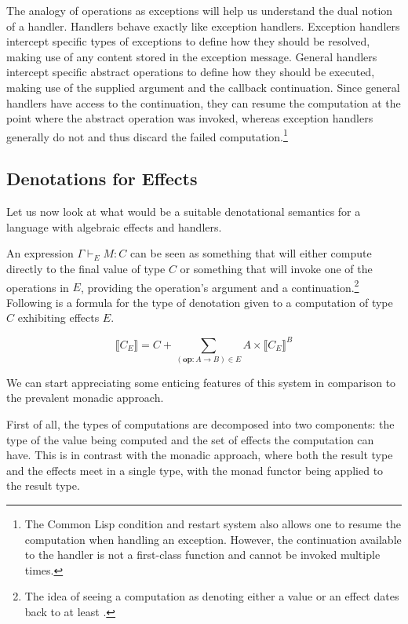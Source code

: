 \documentclass{article}
\newcommand{\sem}[1]{\llbracket #1 \rrbracket}
\newcommand{\effect}[1]{\textbf{#1}}
\begin{document}
The analogy of operations as exceptions will help us understand the dual
notion of a handler. Handlers behave exactly like exception
handlers. Exception handlers intercept specific types of exceptions to define
how they should be resolved, making use of any content stored in the exception
message. General handlers intercept specific abstract operations to define how
they should be executed, making use of the supplied argument and the callback
continuation. Since general handlers have access to the continuation, they can
resume the computation at the point where the abstract operation was invoked,
whereas exception handlers generally do not and thus discard the failed
computation.\footnote{The Common Lisp condition and restart system also allows
  one to resume the computation when handling an exception. However, the
  continuation available to the handler is not a first-class function and
  cannot be invoked multiple times.}

\subsection{Denotations for Effects}
\label{ssec:denotations-for-effects}

Let us now look at what would be a suitable denotational semantics for a
language with algebraic effects and handlers.

An expression $\Gamma \vdash_E M : C$ can be seen as something that will
either compute directly to the final value of type $C$ or something that will
invoke one of the operations in $E$, providing the operation's argument and a
continuation.\footnote{The idea of seeing a computation as denoting either a
  value or an effect dates back to at least \citet{cartwright1994extensible}.}
Following is a formula for the type of denotation given to a computation of type
$C$ exhibiting effects $E$. \citep{bauer2012programming}
\citep{kiselyov2013extensible}

$$
\sem{C_E} = C + \sum_{(\effect{op} : A \to B) \in E} A \times \sem{C_E}^B
$$

We can start appreciating some enticing features of this system in comparison
to the prevalent monadic approach.

First of all, the types of computations are decomposed into two components:
the type of the value being computed and the set of effects the computation
can have. This is in contrast with the monadic approach, where both the result
type and the effects meet in a single type, with the monad functor being
applied to the result type.
\end{document}
